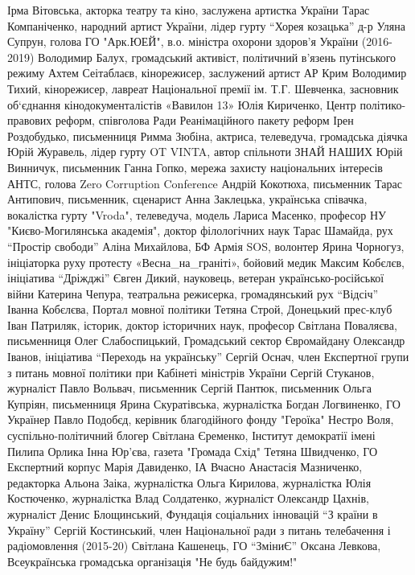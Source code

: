 Ірма Вітовська, акторка театру та кіно, заслужена артистка України
Тарас Компаніченко, народний артист України, лідер гурту “Хорея козацька”
д-р Уляна Супрун, голова ГО "Арк.ЮЕЙ", в.о. міністра охорони здоров'я України (2016-2019)
Володимир Балух, громадський активіст, політичний в'язень путінського режиму
Ахтем Сеітаблаєв, кінорежисер, заслужений артист АР Крим
Володимир Тихий, кінорежисер, лавреат Національної премії ім. Т.Г. Шевченка, засновник об‘єднання кінодокументалістів «Вавилон 13»
Юлія Кириченко, Центр політико-правових реформ, співголова Ради Реанімаційного пакету реформ
Ірен Роздобудько, письменниця
Римма Зюбіна, актриса, телеведуча, громадська діячка
Юрій Журавель, лідер гурту OT VINTA, автор спільноти ЗНАЙ НАШИХ
Юрій Винничук, письменник
Ганна Гопко, мережа захисту національних інтересів АНТС, голова Zero Corruption Conference
Андрій Кокотюха, письменник
Тарас Антипович, письменник, сценарист
Анна Заклецька, українська співачка, вокалістка гурту "Vroda", телеведуча, модель
Лариса Масенко, професор НУ "Києво-Могилянська академія", доктор філологічних наук
Тарас Шамайда, рух “Простір свободи”
Аліна Михайлова, БФ Армія SOS, волонтер
Ярина Чорногуз, ініціаторка руху протесту «Весна_на_граніті», бойовий медик
Максим Кобєлєв, ініціатива “Дріжджі”
Євген Дикий, науковець, ветеран українсько-російської війни
Катерина Чепура, театральна режисерка, громадянський рух “Відсіч”
Іванна Кобєлєва, Портал мовної політики
Тетяна Строй, Донецький прес-клуб
Іван Патриляк, історик, доктор історичних наук, професор
Світлана Поваляєва, письменниця
Олег Слабоспицький, Громадський сектор Євромайдану
Олександр Іванов, ініціатива “Переходь на українську”
Сергій Оснач, член Експертної групи з питань мовної політики при Кабінеті міністрів України
Сергій Стуканов, журналіст
Павло Вольвач, письменник
Сергій Пантюк, письменник
Ольга Купріян, письменниця
Ярина Скуратівська, журналістка
Богдан Логвиненко, ГО Українер
Павло Подобєд, керівник благодійного фонду "Героїка"
Нестро Воля, суспільно-політичний блогер
Світлана Єременко, Інститут демократії імені Пилипа Орлика
Інна Юр'єва, газета "Громада Схід"
Тетяна Швидченко, ГО Експертний корпус
Марія Давиденко, ІА Вчасно
Анастасія Мазниченко, редакторка
Альона Заіка, журналістка
Ольга Кирилова, журналістка
Юлія Костюченко, журналістка
Влад Солдатенко, журналіст
Олександр Цахнів, журналіст
Денис Блощинський, Фундація соціальних інновацій “З країни в Україну”
Сергій Костинський, член Національної ради з питань телебачення і радіомовлення (2015-20)
Світлана Кашенець, ГО “ЗміниЄ”
Оксана Левкова, Всеукраїнська громадська організація "Не будь байдужим!"
